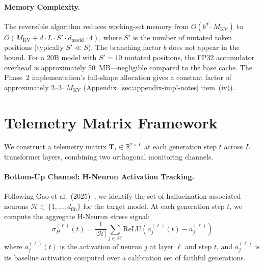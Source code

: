 \paragraph{Memory Complexity.} The reversible algorithm reduces working-set memory from $O(b^d \cdot M_{\text{KV}})$ to $O(M_{\text{KV}} + d \cdot L \cdot S' \cdot d_{\text{model}} \cdot 4)$, where $S'$ is the number of mutated token positions (typically $S' \ll S$). The branching factor $b$ does not appear in the bound. For a 20B model with $S' = 10$ mutated positions, the FP32 accumulator overhead is approximately 50~MB---negligible compared to the base cache. The Phase~2 implementation's full-shape allocation gives a constant factor of approximately $2$--$3 \cdot M_{\text{KV}}$ (Appendix~\ref{sec:appendix-impl-notes} item~(iv)).

\section{Telemetry Matrix Framework}\label{sec:appendix-telemetry}

We construct a telemetry matrix $\mathbf{T}_t \in \mathbb{R}^{2 \times L}$ at each generation step $t$ across $L$ transformer layers, combining two orthogonal monitoring channels.

\paragraph{Bottom-Up Channel: H-Neuron Activation Tracking.}
Following Gao et al.\ (2025)~\cite{gao2025hneurons}, we identify the set of hallucination-associated neurons $\mathcal{H} \subset \{1, \ldots, d_{\text{ffn}}\}$ for the target model. At each generation step $t$, we compute the aggregate H-Neuron stress signal:
\begin{equation}
\sigma_H^{(\ell)}(t) = \frac{1}{|\mathcal{H}|} \sum_{j \in \mathcal{H}} \text{ReLU}\left(a_j^{(\ell)}(t) - \bar{a}_j^{(\ell)}\right)
\label{eq:hneuron_stress}
\end{equation}
where $a_j^{(\ell)}(t)$ is the activation of neuron $j$ at layer $\ell$ and step $t$, and $\bar{a}_j^{(\ell)}$ is its baseline activation computed over a calibration set of faithful generations.

